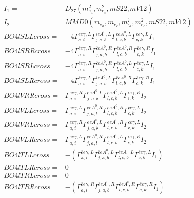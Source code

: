 \documentclass[A4,landscape]{article}
\begin{document}
\begin{align} 
I_1 = & D_{27}(m^2_{e_{{a}}}, m^2_{e_{{c}}}, mS22, mV12) \\ 
I_2 = & MMD0(m_{e_{{a}}}, m_{e_{{c}}}, m^2_{e_{{a}}}, m^2_{e_{{c}}}, mS22, mV12) \\ 
  BO4lSLLcross= & -4  \Gamma^{\bar{e}e \gamma ,L}_{a, i} \Gamma^{\bar{e}e A^0 ,L}_{j, a, b} \Gamma^{\bar{e}e A^0 ,L}_{l, c, b} \Gamma^{\bar{e}e \gamma ,L}_{c, k} I_1 \\ 
  BO4lSRRcross= & -4  \Gamma^{\bar{e}e \gamma ,R}_{a, i} \Gamma^{\bar{e}e A^0 ,R}_{j, a, b} \Gamma^{\bar{e}e A^0 ,R}_{l, c, b} \Gamma^{\bar{e}e \gamma ,R}_{c, k} I_1 \\ 
  BO4lSRLcross= & -4  \Gamma^{\bar{e}e \gamma ,R}_{a, i} \Gamma^{\bar{e}e A^0 ,R}_{j, a, b} \Gamma^{\bar{e}e A^0 ,L}_{l, c, b} \Gamma^{\bar{e}e \gamma ,L}_{c, k} I_1 \\ 
  BO4lSLRcross= & -4  \Gamma^{\bar{e}e \gamma ,L}_{a, i} \Gamma^{\bar{e}e A^0 ,L}_{j, a, b} \Gamma^{\bar{e}e A^0 ,R}_{l, c, b} \Gamma^{\bar{e}e \gamma ,R}_{c, k} I_1 \\ 
  BO4lVRRcross= &  \Gamma^{\bar{e}e \gamma ,R}_{a, i} \Gamma^{\bar{e}e A^0 ,L}_{j, a, b} \Gamma^{\bar{e}e A^0 ,L}_{l, c, b} \Gamma^{\bar{e}e \gamma ,R}_{c, k} I_2 \\ 
  BO4lVLLcross= &  \Gamma^{\bar{e}e \gamma ,L}_{a, i} \Gamma^{\bar{e}e A^0 ,R}_{j, a, b} \Gamma^{\bar{e}e A^0 ,R}_{l, c, b} \Gamma^{\bar{e}e \gamma ,L}_{c, k} I_2 \\ 
  BO4lVRLcross= &  \Gamma^{\bar{e}e \gamma ,R}_{a, i} \Gamma^{\bar{e}e A^0 ,L}_{j, a, b} \Gamma^{\bar{e}e A^0 ,R}_{l, c, b} \Gamma^{\bar{e}e \gamma ,L}_{c, k} I_2 \\ 
  BO4lVLRcross= &  \Gamma^{\bar{e}e \gamma ,L}_{a, i} \Gamma^{\bar{e}e A^0 ,R}_{j, a, b} \Gamma^{\bar{e}e A^0 ,L}_{l, c, b} \Gamma^{\bar{e}e \gamma ,R}_{c, k} I_2 \\ 
  BO4lTLLcross= & -( \Gamma^{\bar{e}e \gamma ,L}_{a, i} \Gamma^{\bar{e}e A^0 ,L}_{j, a, b} \Gamma^{\bar{e}e A^0 ,L}_{l, c, b} \Gamma^{\bar{e}e \gamma ,L}_{c, k} I_1) \\ 
  BO4lTLRcross= & 0 \\ 
  BO4lTRLcross= & 0 \\ 
  BO4lTRRcross= & -( \Gamma^{\bar{e}e \gamma ,R}_{a, i} \Gamma^{\bar{e}e A^0 ,R}_{j, a, b} \Gamma^{\bar{e}e A^0 ,R}_{l, c, b} \Gamma^{\bar{e}e \gamma ,R}_{c, k} I_1) \\ 
\end{align} 
\end{document}
